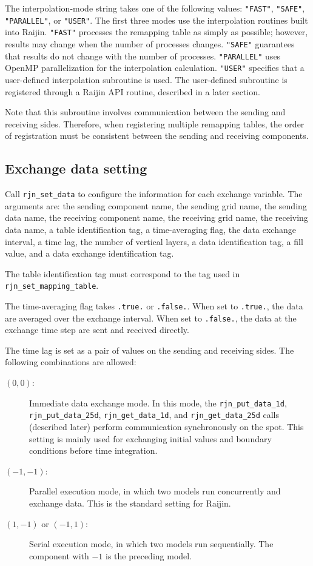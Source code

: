 \documentclass[11pt,a4paper]{report}
\begin{document}
The interpolation-mode string
takes one of the following values:
\texttt{"FAST"}, \texttt{"SAFE"},
\texttt{"PARALLEL"}, or \texttt{"USER"}.
The first three modes use
the interpolation routines built into Raijin.
\texttt{"FAST"} processes the remapping table
as simply as possible;
however, results may change
when the number of processes changes.
\texttt{"SAFE"} guarantees that results
do not change with the number of processes.
\texttt{"PARALLEL"} uses OpenMP parallelization
for the interpolation calculation.
\texttt{"USER"} specifies that
a user-defined interpolation subroutine is used.
The user-defined subroutine is registered
through a Raijin API routine,
described in a later section.

Note that this subroutine involves communication
between the sending and receiving sides.
Therefore, when registering multiple remapping tables,
the order of registration must be consistent
between the sending and receiving components.

\subsection{Exchange data setting}

Call \texttt{rjn\_set\_data}
to configure the information for each exchange variable.
The arguments are:
the sending component name,
the sending grid name,
the sending data name,
the receiving component name,
the receiving grid name,
the receiving data name,
a table identification tag,
a time-averaging flag,
the data exchange interval,
a time lag,
the number of vertical layers,
a data identification tag,
a fill value,
and a data exchange identification tag.

The table identification tag
must correspond to the tag used
in \texttt{rjn\_set\_mapping\_table}.

The time-averaging flag
takes \texttt{.true.} or \texttt{.false.}.
When set to \texttt{.true.},
the data are averaged over the exchange interval.
When set to \texttt{.false.},
the data at the exchange time step
are sent and received directly.

The time lag is set as a pair of values
on the sending and receiving sides.
The following combinations are allowed:

\begin{description}
\item[$(0, 0)$:]
  Immediate data exchange mode.
  In this mode, the \texttt{rjn\_put\_data\_1d},
  \texttt{rjn\_put\_data\_25d},
  \texttt{rjn\_get\_data\_1d}, and
  \texttt{rjn\_get\_data\_25d} calls
  (described later) perform communication synchronously
  on the spot.
  This setting is mainly used
  for exchanging initial values and boundary conditions
  before time integration.
\item[$(-1, -1)$:]
  Parallel execution mode,
  in which two models run concurrently
  and exchange data.
  This is the standard setting for Raijin.
\item[$(1, -1)$ or $(-1, 1)$:]
  Serial execution mode,
  in which two models run sequentially.
  The component with $-1$ is the preceding model.
\end{description}
\end{document}
